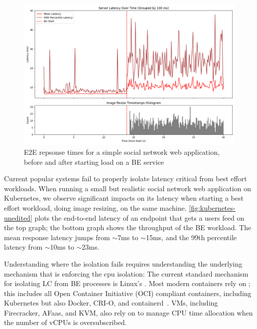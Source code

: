 \begin{figure}[t]
    \centering
    \includegraphics[width=\columnwidth]{graphs/kubernetes-unedited.png}
    \caption{E2E repsonse times for a simple social network web application,
    before and after starting load on a BE
    service}\label{fig:kubernetes-unedited}
\end{figure}

Current popular systems fail to properly isolate latency critical from best
effort workloads. When running a small but realistic social network web
application on Kubernetes, we observe significant impacts on its latency when
starting a best effort workload, doing image resizing, on the same machine.
\autoref{fig:kubernetes-unedited} plots the end-to-end latency of an endpoint
that gets a users feed on the top graph; the bottom graph shows the throughput
of the BE workload. The mean response latency jumps from $\sim$7ms to
$\sim$15ms, and the 99th percentile latency from $\sim$10ms to $\sim$23ms. 

Understanding where the isolation fails requires understanding the underlying
mechanism that is enforcing the cpu isolation: The current standard mechanism
for isolating LC from BE processes is Linux's \cgroups{}. Most modern containers rely on
\cgroups{}; this includes all Open Container Initiative (OCI) compliant
containers, including Kubernetes but also Docker, CRI-O, and
containerd~\cite{oci-cgroups,docker-docs-cgroups,container-isolation-article}.
VMs, including Firecracker, AFaas, and KVM, also rely on \cgroups{} to manage
CPU time allocation when the number of vCPUs is
oversubscribed.~\cite{kvm-cgroups, firecracker-cgroups,afaas}

